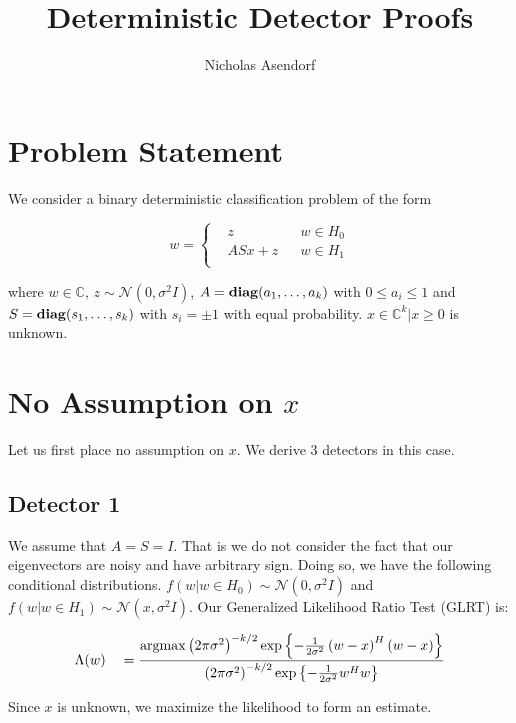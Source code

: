 \documentclass[english]{article}
\title{Deterministic Detector Proofs}
\author{Nicholas Asendorf}
\begin{document}
\maketitle

\section{Problem Statement}

We consider a binary deterministic classification problem of the form

\begin{equation}\label{eq:prob state}
w=\left\{
\begin{aligned}
&z
&& w\in H_0\\
&ASx+z
&& w\in H_1\\
\end{aligned}\right.
\end{equation}

where $w\in\mathbb{C}$, $z\sim\mathcal{N}(0,\sigma^2I)$, $A=\mathop{\bf diag}(a_1,\dots,a_k)$ with $0\leq a_i\leq 1$ and $S=\mathop{\bf diag}(s_1,\dots,s_k)$ with $s_i=\pm1$ with equal probability. $x\in\mathbb{C}^k|x\geq 0$ is unknown.

\section{No Assumption on $x$}
Let us first place no assumption on $x$. We derive 3 detectors in this case.

\subsection{Detector 1}
We assume that $A=S=I$. That is we do not consider the fact that our eigenvectors are noisy and have arbitrary sign. Doing so, we have the following conditional distributions. $f(w|w\in H_0)\sim\mathcal{N}(0,\sigma^2I)$ and $f(w|w\in H_1)\sim\mathcal{N}(x,\sigma^2I)$. Our Generalized Likelihood Ratio Test (GLRT) is:

\begin{equation}
\begin{aligned}
&\Lambda(w)
&&=\frac{\mathop{\rm argmax}\left(2\pi\sigma^2\right)^{-k/2}\exp\left\{-\frac{1}{2\sigma^2}\left(w-x\right)^H\left(w-x\right)\right\}}{\left(2\pi\sigma^2\right)^{-k/2}\exp\left\{-\frac{1}{2\sigma^2}w^Hw\right\}}\\
\end{aligned}
\end{equation}

Since $x$ is unknown, we maximize the likelihood to form an estimate.
\end{document}

